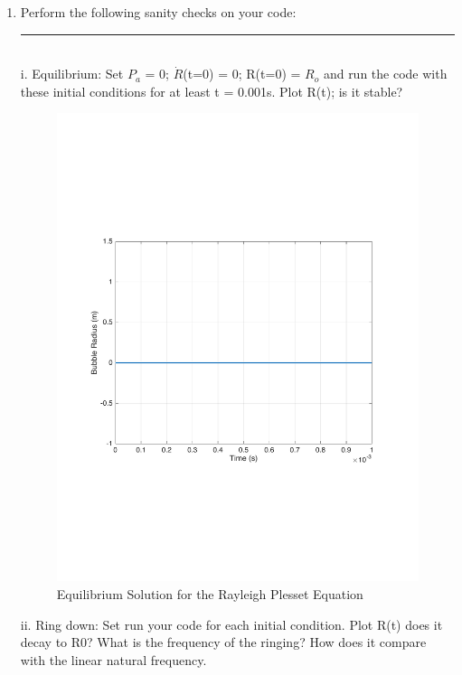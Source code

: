 \documentclass[12pt]{article}
\begin{document}
\begin{enumerate}
\item Perform the following sanity checks on your code:\\
\noindent\rule{14cm}{0.4pt}\\
i. Equilibrium: Set $P_a$ = 0; $\dot{R}$(t=0) = 0; R(t=0) = $R_o$ and run the code with these initial conditions for at least t = 0.001s. Plot R(t); is it stable? 
\begin{figure}[h]
\includegraphics[scale = 0.4]{Fig_1}
\centering
\caption{Equilibrium Solution for the Rayleigh Plesset Equation}
\end{figure}
\newpage
ii. Ring down:  Set run your code for each initial condition.  Plot R(t) does it decay to R0? What is the frequency of the ringing?  How does it compare with the linear natural frequency.
\begin{figure}[h]

\end{figure}
\end{enumerate}
\end{document}

